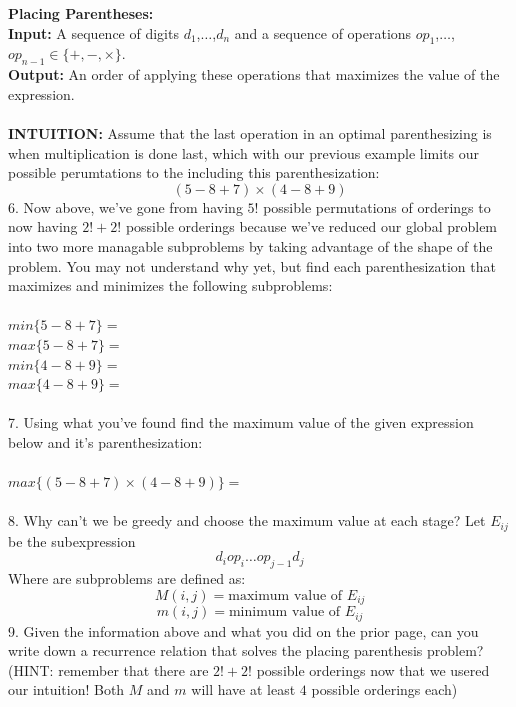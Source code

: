 \documentclass[12pt]{article}
\begin{document}
\newpage
\noindent \textbf{Placing Parentheses:}\\
\textbf{Input:} A sequence of digits $d_1$,$\dots$,$d_n$ and a sequence of operations $op_1$,$\dots$,$op_{n-1} \in \{ +,-,\times \}$.\\
\textbf{Output:} An order of applying these operations that maximizes the value of the expression.\\\\
\textbf{INTUITION:} Assume that the last operation in an optimal parenthesizing 
is when multiplication is done last, which with our previous example limits our possible
perumtations to the including this parenthesization:
$$(5-8+7) \times (4 - 8 + 9)$$
6. Now above, we've gone from having $5!$ possible
permutations of orderings to now having $2! + 2!$ possible orderings
because we've reduced our global problem into two more managable subproblems
by taking advantage of the shape of the problem. You may not understand why yet, but find each
parenthesization that maximizes and minimizes the following subproblems:\\\\
$min\{5-8+7\}=$\\
$max\{5-8+7\}=$\\
$min\{4-8+9\}=$\\
$max\{4-8+9\}=$\\\\
7. Using what you've found 
find the maximum value of the given expression below
and it's parenthesization:\\\\
$max\{(5-8+7) \times (4-8+9)\}=$\\\\
8. Why can't we be greedy and choose the maximum value at each stage? 
\newpage
\noindent Let $E_{ij}$ be the subexpression
$$d_i op_i \dots op_{j-1}d_j$$
Where are subproblems are defined as:
$$M(i,j) = \text{maximum value of } E_{ij}$$
$$m(i,j) = \text{minimum value of } E_{ij}$$
9. Given the information above and what you did on the prior page, 
can you write down a recurrence relation that solves the placing 
parenthesis problem? (HINT: remember that there are $2! + 2!$ possible 
orderings now that we usered our intuition! Both $M$ and $m$ will
have at least $4$ possible orderings each)\\\\\\\\\\\\\\\\\\
\end{document}
